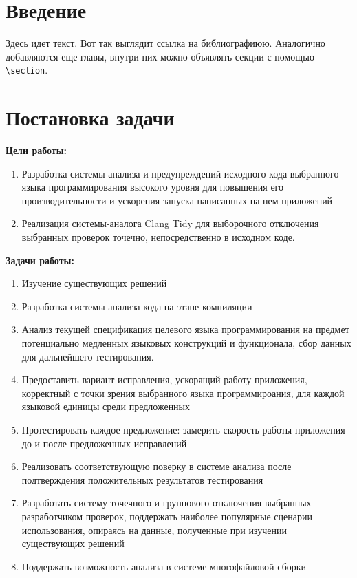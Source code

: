 \documentclass{mipt-thesis-bs}
\begin{document}
\mainmatter


\chapter{Введение}

Здесь идет текст. Вот так выглядит ссылка на библиографиюю. Аналогично добавляются еще главы, внутри них можно объявлять секции с помощью \verb|\section|.



\chapter{Постановка задачи}

\textbf{Цели работы:}

\begin{enumerate}
    \item Разработка системы анализа и предупреждений исходного кода выбранного языка программирования высокого уровня 
для повышения его производительности и ускорения запуска написанных на нем приложений
    \item Реализация системы-аналога Clang Tidy для выборочного отключения выбранных проверок точечно, непосредственно в исходном коде.
\end{enumerate}

\textbf{Задачи работы:}

\begin{enumerate}
    \item Изучение существующих решений
    \item Разработка системы анализа кода на этапе компиляции
    \item Анализ текущей спецификация целевого языка программирования на предмет потенциально медленных языковых конструкций и функционала, 
    сбор данных для дальнейшего тестирования.
    \item Предоставить вариант исправления, ускорящий работу приложения, корректный с точки 
    зрения выбранного языка программироания, для каждой языковой единицы среди предложенных
    \item Протестировать каждое предложение: замерить скорость работы приложения до и после предложенных исправлений
    \item Реализовать соответствующую поверку в системе анализа после подтверждения положительных результатов тестирования
    \item Разработать систему точечного и группового отключения выбранных разработчиком проверок, поддержать наиболее популярные сценарии 
    использования, опираясь на данные, полученные при изучении существующих решений
    \item Поддержать возможность анализа в системе многофайловой сборки

\end{enumerate}
\end{document}
